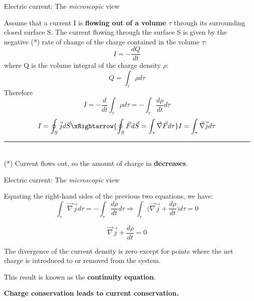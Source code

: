 \begin{frame}{Electric current: The {\em microscopic} view }

Assume that a current I is {\bf flowing out of a volume $\tau$}
through its surrounding closed surface S.
The current flowing through the surface S is given by the negative (*)
rate of change of the charge contained in the volume $\tau$:
\begin{equation*}
   I = - \frac{dQ}{dt}
\end{equation*}
where Q is the volume integral of the charge density $\rho$:
\begin{equation*}
   Q = \int_{\tau} \rho d\tau
\end{equation*}
Therefore
\begin{equation*}
   I = - \frac{d}{dt} \int_{\tau} \rho d\tau = - \int_{\tau} \frac{d\rho}{dt} d\tau
\end{equation*}
\begin{equation*}
   I = \oint_{S} \vec{j} d\vec{S}
     \xRightarrow{\oint_{S} \vec{F} d\vec{S} = \int_{\tau} \vec{\nabla} \vec{F} d\tau}
   I = \int_{\tau} \vec{\nabla} \vec{j} d\tau
\end{equation*}

\noindent\rule{2cm}{0.4pt}\\
{\scriptsize
 (*) Current flows out, so the amount of charge in {\bf decreases}.\\
}

\end{frame}

%
%
%

\begin{frame}{Electric current: The {\em microscopic} view }

Equating the right-hand sides of the previous two equations, we have:
\begin{equation*}
  \int_{\tau} \vec{\nabla} \vec{j} d\tau = - \int_{\tau} \frac{d\rho}{dt} d\tau \Rightarrow
  \int_{\tau} \Big( \vec{\nabla} \vec{j} +\frac{d\rho}{dt} \Big) d\tau = 0
\end{equation*}

\begin{equation*}
    \vec{\nabla} \vec{j} +\frac{d\rho}{dt} = 0
\end{equation*}

\vspace{0.2cm}

The divergence of the current density is zero except for points where the
net charge is introduced to or removed from the system.\\

\vspace{0.2cm}

This result is known as the {\bf continuity equation}.\\

\vspace{0.2cm}

{\bf Charge conservation leads to current conservation.}\\

\end{frame}



